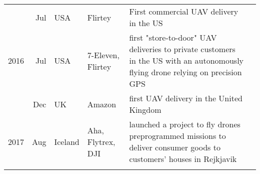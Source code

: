 \begin{table}
\begin{tabular}{r r l L{0.15\textwidth} L{0.5\textwidth} l}
            & Jul   & USA       & Flirtey                   & First commercial UAV delivery in the US                                       &\cite{Flirtey2015} \\
    2016    & Jul   & USA       & 7-Eleven, Flirtey         & first "store-to-door" UAV deliveries to private customers in the US with an autonomously flying drone relying on precision GPS & \cite{PostnParcel}\\
            & Dec   & UK        & Amazon                    & first UAV delivery in the United Kingdom                                      &  \cite{Amazon2016} \\
    2017    & Aug   & Iceland   & Aha, Flytrex, DJI         & launched a project to fly drones preprogrammed missions to deliver consumer goods to customers' houses in Rejkjavik & \cite{Ross2018} \\
            
    \bottomrule\\
    \end{tabular}
\end{table}












